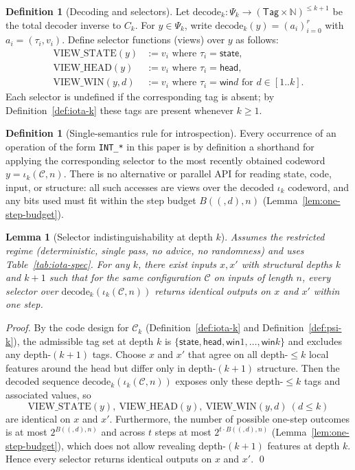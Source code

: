 \documentclass[11pt]{article}
\let\oldlog\log
\renewcommand{\log}{\oldlog_2}
\newtheorem{lemma}[theorem]{Lemma}
\theoremstyle{plain}
\theoremstyle{definition}
\newtheorem{definition}[theorem]{Definition}
\newcommand{\B}[2]{B(#1,#2)}  %
\begin{document}
\begin{definition}[Decoding and selectors]
Let $\mathrm{decode}_k: \Psi_k \to (\mathsf{Tag}\times\mathbb{N})^{\le k+1}$ be the total decoder inverse to $C_k$. For $y\in\Psi_k$, write $\mathrm{decode}_k(y)=(a_i)_{i=0}^{r}$ with $a_i=(\tau_i,v_i)$. Define selector functions (views) over $y$ as follows:
\begin{align*}
\mathrm{VIEW\_STATE}(y) &:= v_i \text{ where } \tau_i=\textsf{state}, \\
\mathrm{VIEW\_HEAD}(y) &:= v_i \text{ where } \tau_i=\textsf{head}, \\
\mathrm{VIEW\_WIN}(y,d) &:= v_i \text{ where } \tau_i=\textsf{win}d \text{ for } d\in[1..k].
\end{align*}
Each selector is undefined if the corresponding tag is absent; by Definition~\ref{def:iota-k} these tags are present whenever $k\ge 1$.
\end{definition}

\begin{definition}[Single-semantics rule for introspection]
Every occurrence of an operation of the form \texttt{INT\_*} in this paper is by definition a shorthand for applying the corresponding selector to the most recently obtained codeword $y=\iota_k(\mathcal{C},n)$. There is no alternative or parallel API for reading state, code, input, or structure: all such accesses are views over the decoded $\iota_k$ codeword, and any bits used must fit within the step budget $\B(d,n)$ (Lemma~\ref{lem:one-step-budget}).
\end{definition}

\begin{lemma}[Selector indistinguishability at depth $k$]
\label{lem:selector-indistinguishability}
Assumes the restricted regime (deterministic, single pass, no advice, no randomness) and uses Table~\ref{tab:iota-spec}.
For any $k$, there exist inputs $x,x'$ with structural depths $k$ and $k{+}1$ such that for the same configuration $\mathcal{C}$ on inputs of length $n$, every selector over $\mathrm{decode}_k(\iota_k(\mathcal{C},n))$ returns identical outputs on $x$ and $x'$ within one step.
\end{lemma}

\begin{proof}
By the code design for $\mathcal{C}_k$ (Definition~\ref{def:iota-k} and Definition~\ref{def:psi-k}), the admissible tag set at depth $k$ is $\{\textsf{state},\textsf{head},\textsf{win}1,\ldots,\textsf{win}k\}$ and excludes any depth-$(k{+}1)$ tags. Choose $x$ and $x'$ that agree on all depth-$\le k$ local features around the head but differ only in depth-$(k{+}1)$ structure. Then the decoded sequence $\mathrm{decode}_k(\iota_k(\mathcal{C},n))$ exposes only these depth-$\le k$ tags and associated values, so
\[\mathrm{VIEW\_STATE}(y),\ \mathrm{VIEW\_HEAD}(y),\ \mathrm{VIEW\_WIN}(y,d)~(d\le k)\]
are identical on $x$ and $x'$. Furthermore, the number of possible one-step outcomes is at most $2^{\B(d,n)}$ and across $t$ steps at most $2^{t \cdot \B(d,n)}$ (Lemma~\ref{lem:one-step-budget}), which does not allow revealing depth-$(k{+}1)$ features at depth $k$. Hence every selector returns identical outputs on $x$ and $x'$. \qed
\end{proof}
\end{document}
